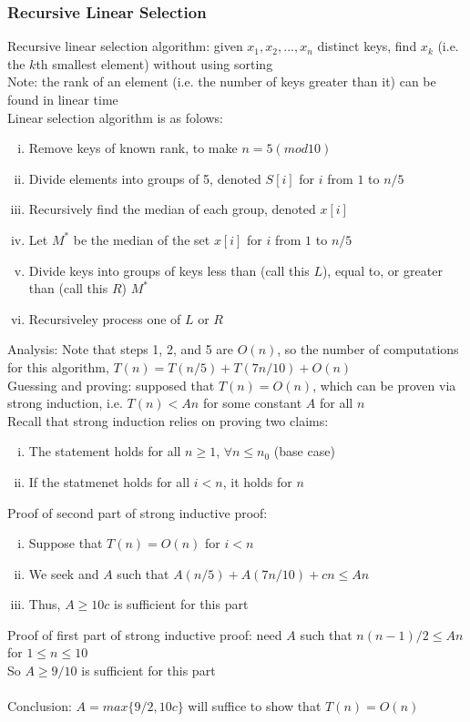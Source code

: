 \documentclass{article}
\begin{document}
			\subsubsection{Recursive Linear Selection}
				Recursive linear selection algorithm: given $x_1, x_2, ..., x_n$ distinct keys, find $x_k$ (i.e. the $k$th smallest element) without using sorting \\
				Note: the rank of an element (i.e. the number of keys greater than it) can be found in linear time \\
				Linear selection algorithm is as folows:
				\begin{enumerate}[(i)]
					\item Remove keys of known rank, to make $n = 5 (mod 10)$
					\item Divide elements into groups of 5, denoted $S[i]$ for $i$ from $1$ to $n/5$
					\item Recursively find the median of each group, denoted $x[i]$
					\item Let $M^*$ be the median of the set $x[i]$ for $i$ from $1$ to $n/5$
					\item Divide keys into groups of keys less than (call this $L$), equal to, or greater than (call this $R$) $M^*$
					\item Recursiveley process one of $L$ or $R$
					\end{enumerate}
				Analysis: Note that steps 1, 2, and 5 are $O(n)$, so the number of computations for this algorithm, $T(n) = T(n/5) + T(7n/10) + O(n)$ \\
				Guessing and proving: supposed that $T(n) = O(n)$, which can be proven via strong induction, i.e. $T(n) < An$ for some constant $A$ for all $n$ \\
				Recall that strong induction relies on proving two claims:
				\begin{enumerate}[(i)]
					\item The statement holds for all $n \geq 1$, $\forall n \leq n_0$ (base case)
					\item If the statmenet holds for all $i < n$, it holds for $n$
					\end{enumerate}
				Proof of second part of strong inductive proof:
				\begin{enumerate}[(i)]
					\item Suppose that $T(n) = O(n)$ for $i < n$
					\item We seek and $A$ such that $A(n/5) + A(7n/10) + cn \leq An$
					\item Thus, $A \geq 10c$ is sufficient for this part
					\end{enumerate}
				Proof of first part of strong inductive proof: need $A$ such that $n(n - 1)/2 \leq An$ for $1 \leq n \leq 10$ \\
				So $A \geq 9/10$ is sufficient for this part \\
				\\
				Conclusion: $A = max\{9/2, 10c\}$ will suffice to show that $T(n) = O(n)$ \\
\end{document}
